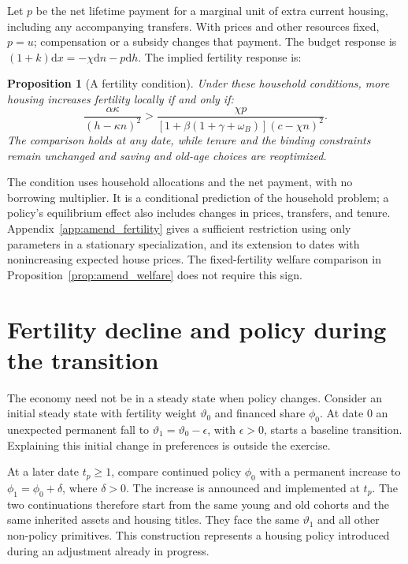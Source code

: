 \documentclass[11pt]{article}
\newtheorem{proposition}{Proposition}
\newcommand{\dd}{\mathrm d}
\begin{document}
Let $p$ be the net lifetime payment for a marginal unit of extra current
housing, including any accompanying transfers. With prices and other
resources fixed, $p=u$; compensation or a subsidy changes that payment.
The budget response is $(1+k)\dd x=-\chi\dd n-p\dd h$.
The implied fertility response is:

\begin{proposition}[A fertility condition]
\label{prop:amend_fertility}
Under these household conditions, more housing increases fertility locally
if and only if:
\begin{equation}
 \frac{\alpha\kappa}{(h-\kappa n)^2}
 >\frac{\chi p}{[1+\beta(1+\gamma+\omega_B)](c-\chi n)^2}.
 \label{eq:amend_fertility_condition}
\end{equation}
The comparison holds at any date, while tenure and the binding constraints
remain unchanged and saving and old-age choices are reoptimized.
\end{proposition}

The condition uses household allocations and the net payment, with no
borrowing multiplier. It is a conditional prediction of the household problem;
a policy's equilibrium effect also includes changes in prices, transfers,
and tenure. Appendix~\ref{app:amend_fertility} gives a sufficient restriction
using only parameters in a stationary specialization, and its extension to
dates with nonincreasing expected house prices. The fixed-fertility welfare
comparison in Proposition~\ref{prop:amend_welfare} does not require this sign.

\section{Fertility decline and policy during the transition}
\label{sec:amend_transition}

The economy need not be in a steady state when policy changes. Consider an
initial steady state with fertility weight $\vartheta_0$ and financed share
$\phi_0$. At date 0 an unexpected permanent fall to
$\vartheta_1=\vartheta_0-\epsilon$, with $\epsilon>0$, starts a baseline
transition. Explaining this initial change in preferences is outside the
exercise.

At a later date $t_p\geq1$, compare continued policy $\phi_0$ with a
permanent increase to $\phi_1=\phi_0+\delta$, where $\delta>0$.
The increase is announced and implemented at $t_p$. The two continuations
therefore start from the same young and old cohorts and the same inherited
assets and housing titles. They face the same $\vartheta_1$ and all other
non-policy primitives. This construction represents a housing policy
introduced during an adjustment already in progress.
\end{document}

